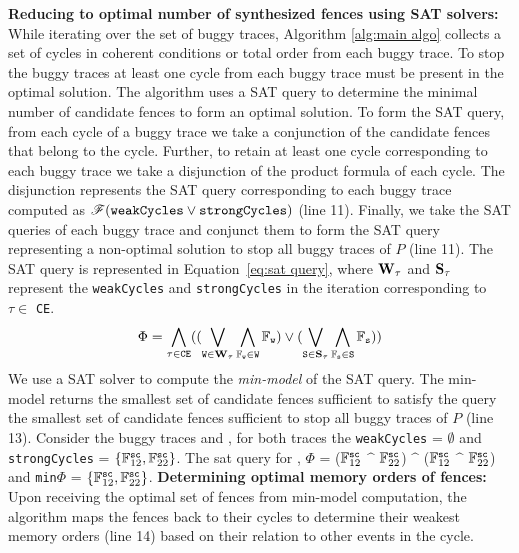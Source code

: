 \noindent
{\bf Reducing to optimal number of synthesized fences 
	using SAT solvers:}
While iterating over the set of buggy traces, Algorithm
\ref{alg:main algo} collects a set of cycles in coherent 
conditions or \sc total order from each buggy trace. 
To stop the buggy traces at least one cycle from each 
buggy trace must be present in the optimal solution.
%
The algorithm uses a SAT query to determine the minimal
number of candidate fences to form an optimal
solution. 
%
To form the SAT query, from each cycle of a buggy trace 
we take a conjunction of the candidate fences that belong 
to the cycle. Further, to retain at least one cycle 
corresponding to each buggy trace we take a disjunction
of the product formula of each cycle.
The disjunction represents the SAT query corresponding to 
each buggy trace computed as $\formula{{\tt weakCycles} \v 
{\tt strongCycles}}$ (line 11).
%
Finally, we take the SAT queries of each buggy trace and 
conjunct them to form the SAT query representing a 
non-optimal solution to stop all buggy traces of $P$ 
(line 11).
The SAT query is represented in Equation~\ref{eq:sat query},
where ${\tt \bf W_\tau}$ and ${\tt \bf S_\tau}$ represent
the {\tt weakCycles} and {\tt strongCycles} in the iteration
corresponding to $\tau \in$ {\tt CE}.
\begin{equation}\label{eq:sat query}
	\Phi = \bigwedge\limits_{\tau \in {\tt CE}}
		(
		(\bigvee\limits_{{\tt W} \in {\tt \bf W_\tau}}
			\bigwedge\limits_{\mathbb{F}_{\tt w} \in {\tt W}} 
			\mathbb{F}_{\tt w})
		\v
		(\bigvee\limits_{{\tt S} \in {\tt \bf S_\tau}}
			\bigwedge\limits_{\mathbb{F}_{\tt s} \in {\tt S}} 
			\mathbb{F}_{\tt s})
		)
\end{equation}
We use a SAT solver to compute the {\em min-model} of the 
SAT query. The min-model returns the smallest set of candidate 
fences sufficient to satisfy the query \ie the smallest set
of candidate fences sufficient to stop all buggy traces of 
$P$ (line 13).
%
Consider the buggy traces  and ,
for both traces the {\tt weakCycles} = $\emptyset$ and
{\tt strongCycles} = $\{\mathbb{F}^\sc_{12}, \mathbb{F}^\sc_{22}\}$.
The sat query for , $\Phi$ = 
($\mathbb{F}^\sc_{12}$ $\^$ $\mathbb{F}^\sc_{22}$) $\^$ 
($\mathbb{F}^\sc_{12}$ $\^$ $\mathbb{F}^\sc_{22}$) and 
{\tt min}$\Phi$ = $\{\mathbb{F}^\sc_{12}, \mathbb{F}^\sc_{22}\}$.
\noindent
{\bf Determining optimal memory orders of fences:}
Upon receiving the optimal set of fences from min-model
computation, the algorithm maps the fences back to their 
cycles to determine their weakest memory orders (line 14)
based on their relation to other events in the cycle.

